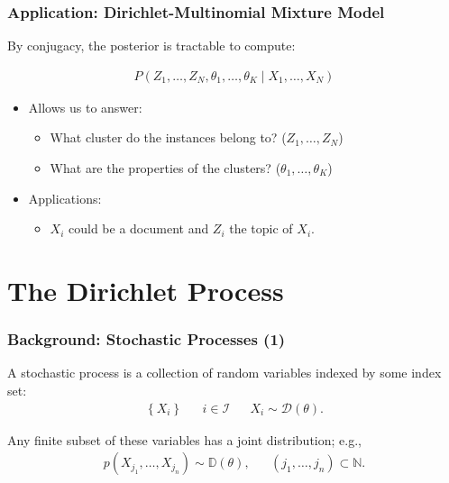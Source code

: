 \documentclass[12pt]{beamer}
\begin{document}
\begin{frame}
    \frametitle{Application: Dirichlet-Multinomial Mixture Model}

    By conjugacy, the posterior is tractable to compute:
    
    \begin{align*}
        P(
        Z_1, \dots, Z_N
        , 
        \theta_1, \dots, \theta_K
        \mid 
            X_1, \dots, X_N
        )
    \end{align*}

    \bigskip

    \pause

    \begin{itemize}
        \item Allows us to answer:
        \begin{itemize}
            \item What cluster do the instances belong to? ($Z_1, \dots, Z_N$)
            \item What are the properties of the clusters? ($\theta_1, \dots, \theta_K$)
        \end{itemize}
        \pause\bigskip
        \item Applications:
        \begin{itemize}
            \item $X_i$ could be a document and $Z_i$ the topic of $X_i$.
        \end{itemize}
    \end{itemize}

    \bigskip


\end{frame}



\section*{The Dirichlet Process}


\begin{frame}
    \frametitle{Background: Stochastic Processes (1)}

    A \alert{stochastic process} is a collection of random variables indexed by
    some index set:
    \begin{align*}
        \left\{X_i\right\}
        &&
        i \in \mathcal{I}
        && 
        X_i \sim \mathcal{D}(\theta).
    \end{align*}

    \bigskip

    \pause

    Any finite subset of these variables has a joint distribution; e.g.,
    \begin{align*}
        p\left(X_{j_1}, \dots, X_{j_n}\right) \sim  \mathbb{D}(\theta),
        && (j_1, \dots, j_n) \subset \mathbb{N}.
    \end{align*}

\end{frame}
\end{document}
